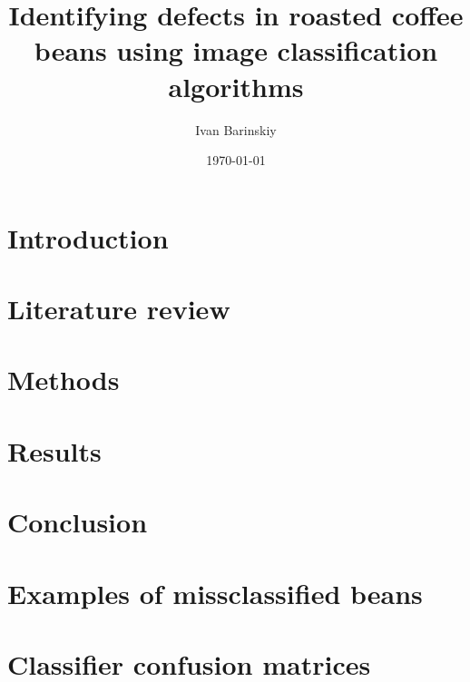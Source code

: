 \documentclass{./template/UoYCSproject}
\author{Ivan Barinskiy}
\date{\today}
\title{Identifying defects in roasted coffee beans using image classification algorithms}
\begin{document}
	\maketitle

	\listoffigures

	\listoftables

	\begin{summary}
		
	\end{summary}

	\chapter{Introduction}
	\label{ch:introduction}
	

	\chapter{Literature review}
	\label{ch:litreview}
	

	\chapter{Methods}
	\label{ch:methods}
	

	\chapter{Results}
	\label{ch:results}
    

	\chapter{Conclusion}
	\label{ch:conclusion}
	

	\appendix
	\chapter{Examples of missclassified beans}
	\label{ch:appendix1}
	

	\chapter{Classifier confusion matrices}
	\label{ch:appendix2}
	

	\printbibliography
\end{document}
